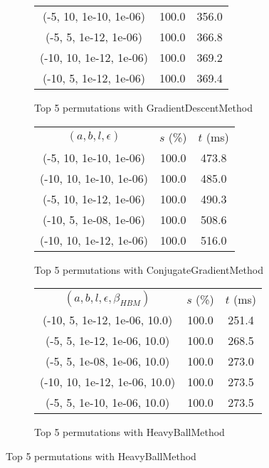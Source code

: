 \begin{figure}[H]
\begin{subfigure}[ht]{.5\textwidth}
\begin{tabular}{|c|c|c|}
(-5, 10, 1e-10, 1e-06) & 100.0 & 356.0 \\
(-5, 5, 1e-12, 1e-06) & 100.0 & 366.8 \\
(-10, 10, 1e-12, 1e-06) & 100.0 & 369.2 \\
(-10, 5, 1e-12, 1e-06) & 100.0 & 369.4 \\
\hline
\end{tabular}
\caption{Top 5 permutations with GradientDescentMethod}
\label{subfig:param_comp_MatrixSquareSum_GradientDescentMethod_FibonacciSearch}
\end{subfigure}
\hfill
\begin{subfigure}[ht]{.5\textwidth}
\begin{tabular}{|c|c|c|}
\hline
\rowcolor{gray!25}
\multicolumn{3}{|c|}{ConjugateGradientMethod} \\
\hline
\rowcolor{gray!25}
$(a,b,l,\epsilon)$ & $s$ (\%) & $t$ (ms) \\
\hline
(-5, 10, 1e-10, 1e-06) & 100.0 & 473.8 \\
(-10, 10, 1e-10, 1e-06) & 100.0 & 485.0 \\
(-5, 10, 1e-12, 1e-06) & 100.0 & 490.3 \\
(-10, 5, 1e-08, 1e-06) & 100.0 & 508.6 \\
(-10, 10, 1e-12, 1e-06) & 100.0 & 516.0 \\
\hline
\end{tabular}
\caption{Top 5 permutations with ConjugateGradientMethod}
\label{subfig:param_comp_MatrixSquareSum_ConjugateGradientMethod_FibonacciSearch}
\end{subfigure}
\hfill
\begin{subfigure}[ht]{.5\textwidth}
\begin{tabular}{|c|c|c|}
\hline
\rowcolor{gray!25}
\multicolumn{3}{|c|}{HeavyBallMethod} \\
\hline
\rowcolor{gray!25}
$(a,b,l,\epsilon,\beta_{HBM})$ & $s$ (\%) & $t$ (ms) \\
\hline
(-10, 5, 1e-12, 1e-06, 10.0) & 100.0 & 251.4 \\
(-5, 5, 1e-12, 1e-06, 10.0) & 100.0 & 268.5 \\
(-5, 5, 1e-08, 1e-06, 10.0) & 100.0 & 273.0 \\
(-10, 10, 1e-12, 1e-06, 10.0) & 100.0 & 273.5 \\
(-5, 5, 1e-10, 1e-06, 10.0) & 100.0 & 273.5 \\
\hline
\end{tabular}
\caption{Top 5 permutations with HeavyBallMethod}
\label{subfig:param_comp_MatrixSquareSum_HeavyBallMethod_FibonacciSearch}
\end{subfigure}
\end{figure}

